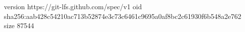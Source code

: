version https://git-lfs.github.com/spec/v1
oid sha256:aab428c54210ac713b52874e3c73c6461c9695a0af8bc2c61930f6b548a2e762
size 87544
